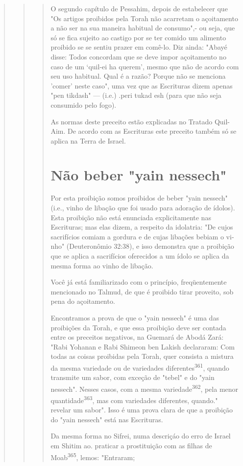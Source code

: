 \begin{quote}
\begin{quote}
\begin{quote}
O segundo capítulo de Pessahim, depois de estabelecer que "Os ar­tigos
proibidos pela Torah não acarretam o açoitamento a não ser na sua
ma­neira habitual de consumo",- ou seja, que só se fica sujeito ao
castigo por se ter comido um alimento proibido se se sentiu prazer em
comê-lo. Diz ainda: "Abayé disse: Todos concordam que se deve impor
açoitamento no caso de um `quil-ei ha querem', mesmo que não de acordo
com seu uso habitual. Qual é a razão? Porque não se menciona 'comer'
neste caso", uma vez que as Escri­turas dizem apenas "pen tikdash" ---
(i.e.) .peri tukad esh (para que não seja consumido
pelo fogo).

As normas deste preceito estão explicadas no Tratado Quil-Aim. De acordo
com as Escrituras este preceito também só se aplica na Terra de Israel.

\section{Não beber "yain nessech"}

Por esta proibição somos proibidos de beber "yain nessech" (i.e., vinho
de libação que foi usado para adoração de ídolos). Esta proibição não
está enunciada explicitamente nas Escrituras; mas elas dizem, a respeito
da ido­latria: "De cujos sacrifícios comiam a gordura e de cujas
libações bebiam o vi­nho" (Deuteronômio 32:38), e isso demonstra que a
proibição que se aplica a sacrifícios oferecidos a um ídolo se aplica da
mesma forma ao vinho de libação.

Você já está familiarizado com o princípio, freqüentemente mencio­nado
no Talmud, de que é proibido tirar proveito, sob pena do açoitamento.

Encontramos a prova de que o "yain nessech" é uma das proibições da
Torah, e que essa proibição deve ser contada entre os preceitos
negativos, na Guemará de Abodá Zará: "Rabi Yohanan e Rabi Shimeon ben
Lakish decla­raram: Com todas as coisas proibidas pela Torah, quer
consista a mistura da mesma variedade ou de variedades
diferentes\textsuperscript{361}, quando transmite um sabor, com exceção
de "tebel" e do "yain nessech". Nesses casos, com a mesma
variedade\textsuperscript{362}, pela menor
quantidade\textsuperscript{363}, mas com variedades diferentes,
quan­do." revelar um sabor". Isso é uma prova clara de
que a proibição do "yain nessech" está nas Escrituras.

Da mesma forma no Sifrei, numa descriçáo do erro de Israel em Shitim
ao. praticar a prostituição com as filhas de
Moab\textsuperscript{365}, lemos: "Entraram;
\end{quote}


\end{quote}
\end{quote}
